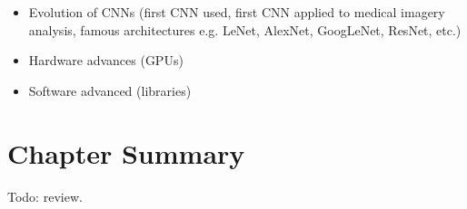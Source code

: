 \begin{itemize}
    \item Evolution of CNNs (first CNN used, first CNN applied to medical imagery analysis, famous architectures e.g. LeNet, AlexNet, GoogLeNet, ResNet, etc.)
    \item Hardware advances (GPUs)
    \item Software advanced (libraries)
\end{itemize}


\section{Chapter Summary}

Todo: review.
